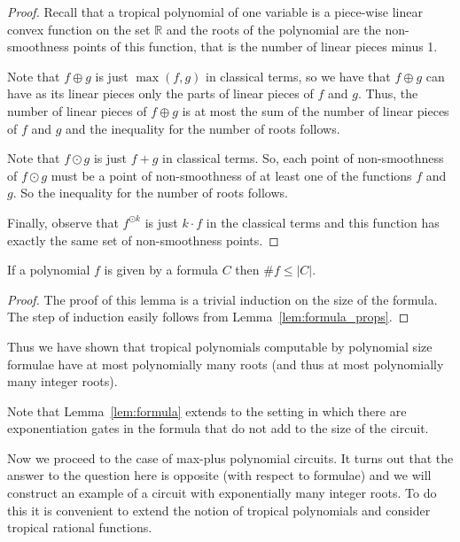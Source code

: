 \documentclass[11pt]{article}
\newcommand{\ta}{\oplus}
\newcommand{\tp}{\odot}
\newcommand{\bb}[1]{\mathbb{#1}}
\begin{document}
\begin{proof}
Recall that a tropical polynomial of one variable is a piece-wise linear convex function on the set $\bb{R}$ and the roots of the polynomial are the non-smoothness points of this function, that is the number of linear pieces minus 1.

Note that $f\ta g$ is just $\max{(f,g)}$ in classical terms, so we have that $f \ta g$ can have as its linear pieces only the parts of linear pieces of $f$ and $g$. Thus, the number of linear pieces of $f\ta g$ is at most the sum of the number of linear pieces of $f$ and $g$ and the inequality for the number of roots follows.

Note that $f \tp g$ is just $f+g$ in classical terms. So, each point of non-smoothness of $f \tp g$ must be a point of non-smoothness of at least one of the functions $f$ and $g$. So the inequality for the number of roots follows.

Finally, observe that $f^{\tp k}$ is just $k\cdot f$ in the classical terms and this function has exactly the same set of non-smoothness points.
\end{proof}

\begin{lemma} \label{lem:formula}
If a polynomial $f$ is given by a formula $C$ then $\# f \leq |C|$.
\end{lemma}

\begin{proof}
The proof of this lemma is a trivial induction on the size of the formula. The step of induction easily follows from Lemma~\ref{lem:formula_props}.
\end{proof}

Thus we have shown that tropical polynomials computable by polynomial size formulae have at most polynomially many roots (and thus at most polynomially many integer roots).

\begin{remark}
Note that Lemma~\ref{lem:formula} extends to the setting in which there are exponentiation gates in the formula that do not add to the size of the circuit.
\end{remark}

Now we proceed to the case of max-plus polynomial circuits. It turns out that the answer to the question here is opposite (with respect to formulae) and we will construct an example of a circuit with exponentially many integer roots. To do this it is convenient to extend the notion of tropical polynomials and consider tropical rational functions.
\end{document}
